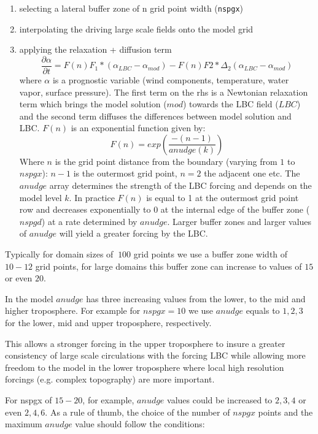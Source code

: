 \begin{enumerate}
\item selecting a lateral buffer zone of n grid point width (\verb=nspgx=)
\item interpolating the driving large scale fields onto the model grid
\item applying the relaxation + diffusion term
\begin{equation}
\frac{\partial \alpha}{\partial t} = F(n)F_1 * (\alpha_{LBC}-\alpha_{mod}) -
    F(n)F2 * \Delta_2(\alpha_{LBC}-\alpha_{mod})
\end{equation}
where $\alpha$ is a prognostic variable (wind components, temperature, water
vapor, surface pressure). The first term on the rhs is a Newtonian relaxation
term which brings the model solution ($mod$) towards the LBC field ($LBC$)
and the second term diffuses the differences between model solution and LBC.
$F(n)$ is an exponential function given by:
\begin{equation}
F(n) = exp\left(\frac{-(n-1)}{anudge(k)}\right)
\end{equation}
Where $n$ is the grid point distance from the boundary (varying from $1$ to
$nspgx$): $n-1$ is the outermost grid point, $n=2$ the adjacent one etc.
The $anudge$ array determines the strength of the LBC forcing and depends on
the model level $k$. In practice $F(n)$ is equal to 1 at the outermost grid
point row and decreases exponentially to $0$ at the internal edge of the buffer
zone ($nspgd$) at a rate determined by $anudge$. Larger buffer zones and larger
values of $anudge$ will yield a greater forcing by the LBC.  
\end{enumerate}

Typically for domain sizes of $~100$ grid points we use a buffer zone width
of $10-12$ grid points, for large domains this buffer zone can increase to
values of $15$ or even $20$.

In the model $anudge$ has three increasing values from the lower, to the mid
and higher troposphere. For example for $nspgx = 10$ we use $anudge$ equals to
$1, 2, 3$ for the lower, mid and upper troposphere, respectively.

This allows a stronger forcing in the upper troposphere to insure a greater
consistency of large scale circulations with the forcing LBC while allowing
more freedom to the model in the lower troposphere where local high resolution
forcings (e.g. complex topography) are more important.

For nspgx of $15-20$, for example, $anudge$ values could be increased to
$2,3,4$ or even $2,4,6$. As a rule of thumb, the choice of the number of
$nspgx$ points and the maximum $anudge$ value should follow the conditions:

